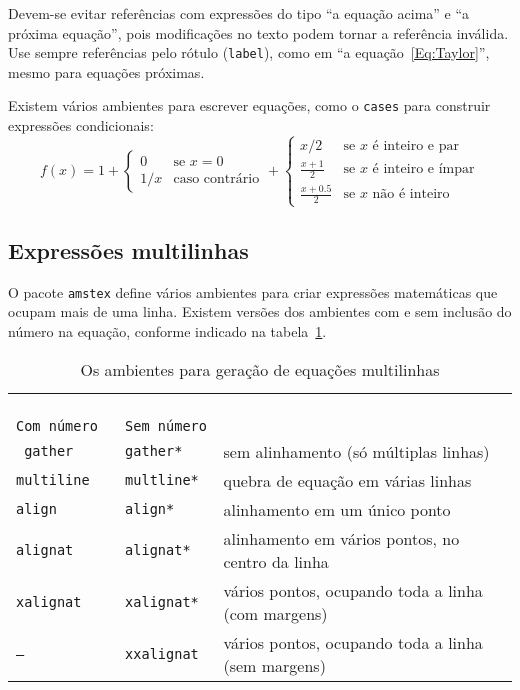 Devem-se evitar referências com expressões do tipo ``a equação acima''
e ``a próxima equação'', pois modificações no texto podem tornar a
referência inválida. Use sempre referências pelo rótulo
(\texttt{label}), como em ``a equação~\ref{Eq:Taylor}'', mesmo para
equações próximas.

Existem vários ambientes para escrever equações, como o \verb|cases|
para construir expressões condicionais:
\begin{equation}
f(x) = 1+\begin{cases}
0   & \text{se $x=0$}\\
1/x & \text{caso contrário}
\end{cases} + \begin{cases}
x/2             & \text{se $x$ é inteiro e par}\\
\frac{x+1}{2}   & \text{se $x$ é inteiro e ímpar}\\
\frac{x+0.5}{2} & \text{se $x$ não é inteiro}
\end{cases}
\end{equation}

\subsection{Expressões multilinhas}
\label{Sec:multilinhas}

O pacote \texttt{amstex} define vários ambientes para criar expressões
matemáticas que ocupam mais de uma linha. Existem versões dos
ambientes com e sem inclusão do número na equação, conforme indicado
na tabela~\ref{Tab:multilinhas}\footnotemark.

\begin{table}[htbp]
\begin{center}
\newlength{\LL}
\settowidth{\LL}{Tipo de alinhamento}
\begin{tabular}{|>{\tt}l|>{\tt}l|l|} \hline
\multicolumn{2}{|c|}{PACOTE} &
\multicolumn{1}{c|}{\multirow{2}{\LL}{Tipo de alinhamento}}
\\ \cline{1-2}
\textrm{Com número} & \textrm{Sem número} &  \\ \hline
gather & gather* & sem alinhamento (só múltiplas linhas) \\
multiline & multline* & quebra de equação em várias linhas \\
align & align* & alinhamento em um único ponto \\
alignat & alignat* & alinhamento em vários pontos, no centro da linha\\
xalignat & xalignat* & vários pontos, ocupando toda a linha (com margens)\\
-- & xxalignat & vários pontos, ocupando toda a linha (sem margens)
\\ \hline
\end{tabular}
\end{center}
\caption{Os ambientes para geração de equações multilinhas}
\label{Tab:multilinhas}
\end{table}


